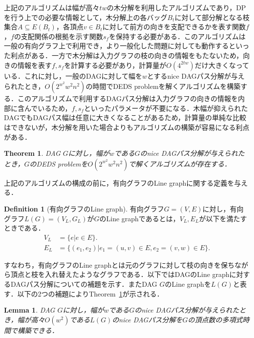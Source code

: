 \documentclass[master]{kuisthesis}		%
\theoremstyle{plain}
\newtheorem{theorem}{Theorem}
\newtheorem{lemma}{Lemma}
\theoremstyle{definition}
\newtheorem{definition*}{Definition}
\begin{document}
上記のアルゴリズムは幅が高々$tw$の木分解を利用したアルゴリズムであり，DPを行う上での必要な情報として，木分解上の各バッグ$B_t$に対して部分解となる枝集合$A\subseteq E(B_t)$，各頂点$v \in B_t$に対して前方の向きを支配できるかを表す関数$f$，$f$の支配関係の根拠を示す関数$s_f$を保持する必要がある．このアルゴリズムは一般の有向グラフ上で利用でき，より一般化した問題に対しても動作するといった利点がある．一方で木分解は入力グラフの枝の向きの情報をもたないため，向きの情報を表す$f, s_f$を計算する必要があり，計算量が$O(4^{2tw})$だけ大きくなっている．これに対し，一般のDAGに対して幅を$w$とするnice DAGパス分解が与えられたとき，$O(2^{w^2}w^2n^2)$の時間でDEDS problemを解くアルゴリズムを構築する．このアルゴリズムで利用するDAGパス分解は入力グラフの向きの情報を内部に含んでいるため，$f, s_f$といったパラメータが不要になる．木幅が抑えられたDAGでもDAGパス幅は任意に大きくなることがあるため，計算量の単純な比較はできないが，木分解を用いた場合よりもアルゴリズムの構築が容易になる利点がある．

\begin{theorem}\label{DEDS_FPT}
    DAG $G$に対し，幅が$w$である$G$のnice DAGパス分解が与えられたとき，$G$のDEDS problemを$O(2^{w^2}w^2n^2)$で解くアルゴリズムが存在する．
\end{theorem}

上記のアルゴリズムの構成の前に，有向グラフのLine graphに関する定義を与える．

\begin{definition*}[有向グラフのLine graph]
    有向グラフ$G=(V, E)$に対し，有向グラフ$L(G)=(V_L, G_L)$が$G$のLine graphであるとは，$V_L, E_L$が以下を満たすときである．
    \begin{align*}
        V_L &= \{e | e\in E\}.\\
        E_L &= \{(e_1, e_2) | e_1=(u, v)\in E, e_2=(v, w)\in E\}.
    \end{align*}
\end{definition*}

すなわち，有向グラフのLine graphとは元のグラフに対して枝の向きを保ちながら頂点と枝を入れ替えたようなグラフである．以下ではDAGのLine graphに対するDAGパス分解についての補題を示す．またDAG $G$のLine graphを$L(G)$と表す．以下の2つの補題によりTheorem~\ref{DEDS_FPT}が示される．

\begin{lemma}\label{DAGパス分解(L(G))}
    DAG $G$に対し，幅が$w$である$G$のnice DAGパス分解が与えられたとき，幅が高々$O(w^2)$である$L(G)$のnice DAGパス分解を$G$の頂点数の多項式時間で構築できる．
\end{lemma}
\end{document}
